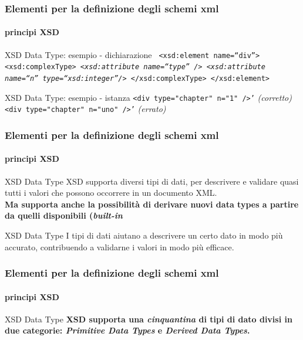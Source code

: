 \begin{frame}
	\frametitle{Elementi per la definizione degli schemi xml}
	\framesubtitle{principi XSD}
	\addtocounter{nframe}{1}

	\begin{block}{XSD Data Type: esempio -  dichiarazione}
		\texttt{
			<xsd:element name=``div''>
			<xsd:complexType>
			\textit{<xsd:attribute name=``type'' />}
			\emph{<xsd:attribute name=``n'' type=``xsd:integer''/>}
			</xsd:complexType>
			</xsd:element>
		}


	\end{block}

	\begin{block}{XSD Data Type: esempio - istanza}
		\texttt{<div type="chapter" n="1" />'} \textit{(corretto)}
		\\\texttt{<div type="chapter" n="uno" />'} \textit{(errato)}

	\end{block}



\end{frame}

\begin{frame}
	\frametitle{Elementi per la definizione degli schemi xml}
	\framesubtitle{principi XSD}
	\addtocounter{nframe}{1}

	\begin{block}{XSD Data Type}
		XSD supporta diversi tipi di dati, per descrivere e validare quasi tutti i valori che possono occorrere in un documento XML. 
		\\\textbf{Ma supporta anche la possibilità di derivare nuovi data types a partire da quelli disponibili (\textit{built-in}}
	\end{block}

	\begin{block}{XSD Data Type}
		I tipi di dati aiutano a descrivere un certo dato in modo più accurato, contribuendo a validarne i valori in modo più efficace.
	\end{block}
	
\end{frame}

\begin{frame}
	\frametitle{Elementi per la definizione degli schemi xml}
	\framesubtitle{principi XSD}
	\addtocounter{nframe}{1}

	\begin{block}{XSD Data Type}
		\textbf{XSD supporta una \textit{cinquantina} di tipi di dato divisi in due categorie: \textit{Primitive Data Types} e \textit{Derived Data Types}.}
	\end{block}
	
\end{frame}

